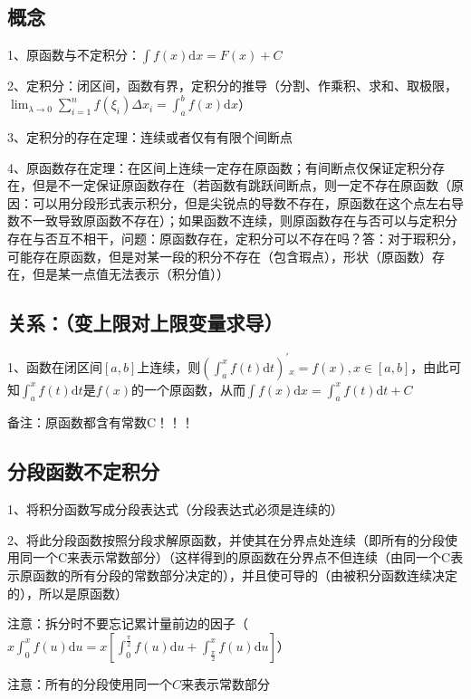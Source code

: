 \subsection{概念}

1、原函数与不定积分：$\int f(x) \mathrm{d} x=F(x)+C$

2、定积分：闭区间，函数有界，定积分的推导（分割、作乘积、求和、取极限，$\lim _{\lambda \rightarrow 0} \sum_{i=1}^{n} f\left(\xi_{i}\right) \Delta x_{i}=\int_{a}^{b} f(x) \mathrm{d} x$）

3、定积分的存在定理：连续或者仅有有限个间断点

4、原函数存在定理：在区间上连续一定存在原函数；有间断点仅保证定积分存在，但是不一定保证原函数存在（若函数有跳跃间断点，则一定不存在原函数（原因：可以用分段形式表示积分，但是尖锐点的导数不存在，原函数在这个点左右导数不一致导致原函数不存在）；如果函数不连续，则原函数存在与否可以与定积分存在与否互不相干，问题：原函数存在，定积分可以不存在吗？答：对于瑕积分，可能存在原函数，但是对某一段的积分不存在（包含瑕点），形状（原函数）存在，但是某一点值无法表示（积分值））



\subsection{关系：（变上限对上限变量求导）}

1、函数在闭区间$[a,b]$上连续，则$\left(\int_{a}^{x} f(t) \mathrm{d} t\right)^{\prime}{ }_{x}=f(x), x \in[a, b]$，由此可知$\int_{a}^{x} f(t) \mathrm{d} t$是$f(x)$的一个原函数，从而$\int f(x) \mathrm{d} x=\int_{a}^{x} f(t) \mathrm{d} t+C$

备注：原函数都含有常数C！！！



\subsection{分段函数不定积分}

1、将积分函数写成分段表达式（分段表达式必须是连续的）

2、将此分段函数按照分段求解原函数，并使其在分界点处连续（即所有的分段使用同一个C来表示常数部分）（这样得到的原函数在分界点不但连续（由同一个C表示原函数的所有分段的常数部分决定的），并且使可导的（由被积分函数连续决定的），所以是原函数）

注意：拆分时不要忘记累计量前边的因子（$x \int_{0}^{x} f(u) \mathrm{d} u=x\left[\int_{0}^{\frac{\pi}{2}} f(u) \mathrm{d} u+\int_{\frac{\pi}{2}}^{x} f(u) \mathrm{d} u\right]$）

注意：所有的分段使用同一个$C$来表示常数部分


